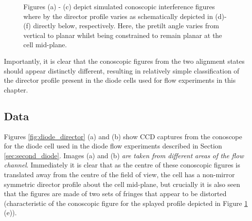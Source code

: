 \begin{figure}
\begin{center}
\end{center}
\caption[Simulated conoscopic figures - director planar at mid-plane]{\label{fig:planar_middle} Figures (a) - (c) depict simulated conoscopic interference figures where by the director profile varies as schematically depicted in (d)-(f) directly below, respectively. Here, the pretilt angle varies from vertical to planar whilst being constrained to remain planar at the cell mid-plane.}
\end{figure}

Importantly, it is clear that the conoscopic figures from the two alignment states should appear distinctly different, resulting in relatively simple classification of the director profile present in the diode cells used for flow experiments in this chapter.

\subsection{Data}
Figures \ref{fig:diode_director} (a) and (b) show CCD captures from the conoscope for the diode cell used in the diode flow experiments described in Section \ref{sec:second_diode}. Images (a) and (b) \textit{are taken from different areas of the flow channel}. Immediately it is clear that as the centre of these conoscopic figures is translated away from the centre of the field of view, the cell has a non-mirror symmetric director profile about the cell mid-plane, but crucially it is also seen that the figures are made of two sets of fringes that appear to be distorted (characteristic of the conoscopic figure for the splayed profile depicted in Figure \ref{fig:planar_middle} (e)). 

